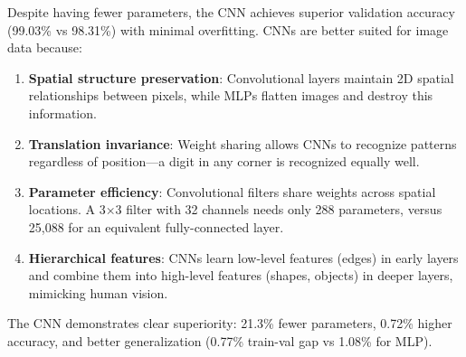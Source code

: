 Despite having fewer parameters, the CNN achieves superior validation accuracy (99.03\% vs 98.31\%) with minimal overfitting. CNNs are better suited for image data because:

\begin{enumerate}
    \item \textbf{Spatial structure preservation}: Convolutional layers maintain 2D spatial relationships between pixels, while MLPs flatten images and destroy this information.
    
    \item \textbf{Translation invariance}: Weight sharing allows CNNs to recognize patterns regardless of position—a digit in any corner is recognized equally well.
    
    \item \textbf{Parameter efficiency}: Convolutional filters share weights across spatial locations. A 3×3 filter with 32 channels needs only 288 parameters, versus 25,088 for an equivalent fully-connected layer.
    
    \item \textbf{Hierarchical features}: CNNs learn low-level features (edges) in early layers and combine them into high-level features (shapes, objects) in deeper layers, mimicking human vision.
\end{enumerate}

The CNN demonstrates clear superiority: 21.3\% fewer parameters, 0.72\% higher accuracy, and better generalization (0.77\% train-val gap vs 1.08\% for MLP).